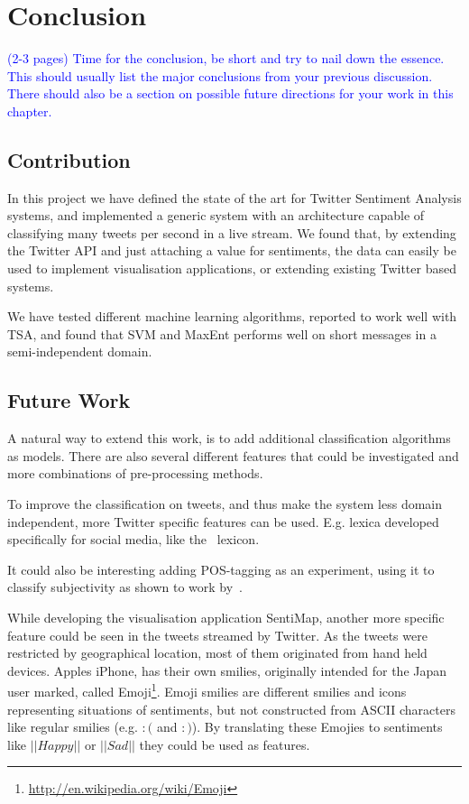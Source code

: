 \chapter{Conclusion}


\textcolor{blue}{(2-3 pages) Time for the conclusion, be short and try to nail down the essence. This should usually 
list the major conclusions from your previous discussion. There should also be a section on possible future directions 
for your work in this chapter.}


\section{Contribution}

In this project we have defined the state of the art for Twitter Sentiment Analysis systems, and implemented a generic system with an architecture capable of classifying many tweets per second in a live stream. We found that, by extending the Twitter API and just attaching a value for sentiments, the data can easily be used to implement visualisation applications, or extending existing Twitter based systems. 

We have tested different machine learning algorithms, reported to work well with TSA, and found that SVM and MaxEnt performs well on short messages in a semi-independent domain. 

\section{Future Work}

A natural way to extend this work, is to add additional classification algorithms as models. There are also several different features that could be investigated and more combinations of pre-processing methods. 

To improve the classification on tweets, and thus make the system less domain independent, more Twitter specific features can be used. E.g. lexica developed specifically for social media, like the~\citet{article:afinn} lexicon. 

It could also be interesting adding POS-tagging as an experiment, using it to classify subjectivity as shown to work by~\citet{article:pak}.

While developing the visualisation application SentiMap, another more specific feature could be seen in the tweets streamed by Twitter. As the tweets were restricted by geographical location, most of them originated from hand held devices. Apples iPhone, has their own smilies, originally intended for the Japan user marked, called Emoji\footnote{\url{http://en.wikipedia.org/wiki/Emoji}}. Emoji smilies are different smilies and icons representing situations of sentiments, but not constructed from ASCII characters like regular smilies (e.g. $:($ and $:)$). By translating these Emojies to sentiments like $||Happy||$ or $||Sad||$ they could be used as features.
